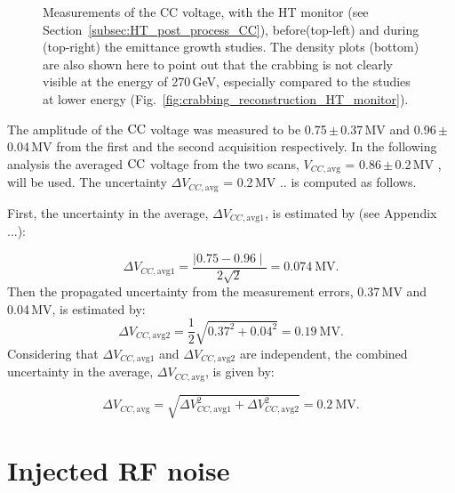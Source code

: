 \begin{figure}[!ht]
\begin{subfigure}[t]{0.45\textwidth}
    \end{subfigure}
    \hfill
     \caption{Measurements of the CC voltage, with the HT monitor (see Section~\ref{subsec:HT_post_process_CC}), before(top-left) and during (top-right) the emittance growth studies. The density plots (bottom) are also shown here to point out that the crabbing is not clearly visible at the energy of 270\,GeV, especially compared to the studies at lower energy (Fig.~\ref{fig:crabbing_reconstruction_HT_monitor}).}
     \label{fig:VCC_MD5_2018} 
\end{figure}

\begin{sloppypar}
The amplitude of the ${\mathrm{CC}}$ voltage was measured to be 0.75\,$\pm$\,0.37\,MV and 0.96\,$\pm$\,0.04\,MV from the first and the second acquisition respectively. In the following analysis the averaged ${\mathrm{CC}}$ voltage from the two scans, $V_{CC, \mathrm{avg}}$ = 0.86\,$\pm$\,0.2\,MV , will be used. The uncertainty  $\Delta V_{CC, \mathrm{avg}}$ = 0.2\,MV .. is computed as follows. 

First, the uncertainty in the average, $\Delta V_{CC, \mathrm{avg1}}$, is estimated by (see Appendix ...): 
\end{sloppypar}
\begin{equation}\label{eq:uncertainty_mean_ws}
    \Delta V_{CC, \mathrm{avg1}} = \frac{\mid 0.75 - 0.96 \mid}{2 \sqrt{2}}=0.074\mathrm{\ MV}.
\end{equation}
Then the propagated uncertainty from the measurement errors, 0.37\,MV and 0.04\,MV, is estimated by:
\begin{equation}\label{eq:propagated_uncertainty_ws}
    \Delta V_{CC, \mathrm{avg2}} = \frac{1}{2}\sqrt{ 0.37^2 + 0.04^2} = 0.19\mathrm{\ MV}.
\end{equation}
Considering that $\Delta V_{CC, \mathrm{avg1}}$ and $\Delta V_{CC, \mathrm{avg2}}$ are independent, the combined uncertainty in the average, $\Delta V_{CC, \mathrm{avg}}$, is given by:

\begin{equation}\label{eq:combined_uncertainty_ws}
    \Delta V_{CC, \mathrm{avg}} = \sqrt{\Delta V_{CC, \mathrm{avg1}} ^2 + \Delta V_{CC, \mathrm{avg2}} ^2}=0.2\mathrm{\ MV}.
\end{equation}


\section{Injected RF noise}\label{sec:noise_meas2018}






